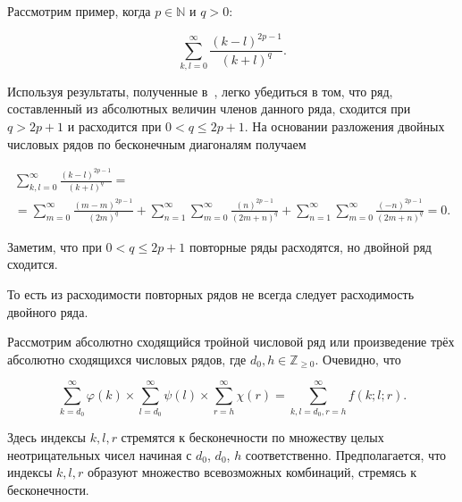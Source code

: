 Рассмотрим  пример, когда $p\in\mathbb{N}$ и $q>0$:

$$

\sum_{k,l=0}^\infty \frac{(k-l)^{2p-1}}{(k+l)^q}.

$$



Используя результаты, полученные в~\cite{korneev:2}, легко убедиться в том, что ряд, составленный из абсолютных величин членов данного ряда, сходится при $q>2p+1$ и расходится при $0< q\le 2p+1$. На основании разложения двойных числовых рядов по бесконечным диагоналям получаем

\begin{multline}

\sum_{k,l=0}^\infty \frac{(k-l)^{2p-1}}{(k+l)^q}= \\=

\sum_{m=0}^\infty \frac{(m-m)^{2p-1}}{(2m)^q}+ 

\sum _{n=1}^\infty\sum_{m=0}^\infty \frac{(n)^{2p-1}}{(2m+n)^q}+

\sum _{n=1}^\infty\sum_{m=0}^\infty \frac{(-n)^{2p-1}}{(2m+n)^q}=0.

\end{multline}



Заметим, что при $0< q\le 2p+1$ повторные ряды расходятся, но двойной ряд сходится. 

То есть из расходимости повторных рядов не всегда следует расходимость двойного ряда.





\smallskip







Рассмотрим абсолютно сходящийся тройной числовой ряд или произведение трёх абсолютно сходящихся числовых рядов, где $d_0, h\in\mathbb{Z}_{\ge 0}$. Очевидно, что

$$

\sum_{k=d_0}^\infty \varphi (k)\times

\sum_{l=d_0}^\infty \psi (l)\times

\sum_{r=h}^\infty \chi(r)=

\sum_{k,l=d_0,r=h}^\infty f(k;l;r).

$$

Здесь индексы $k,l,r$ стремятся к бесконечности по множеству целых неотрицательных чисел начиная с $d_0$, $d_0$, $h$ соответственно. Предполагается, что индексы $k,l,r$ образуют множество всевозможных комбинаций, стремясь к бесконечности.




